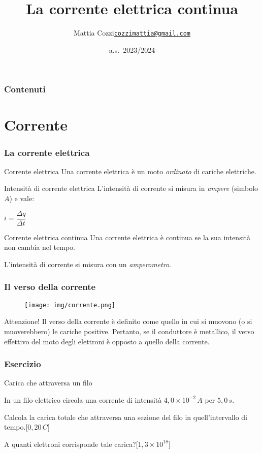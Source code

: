 \documentclass[]{beamer}
\title{La corrente elettrica continua}
\author{\texorpdfstring{Mattia Cozzi\newline\href{mailto:cozzimattia@gmail.com}{\texttt{cozzimattia@gmail.com}}}{Mattia Cozzi}}
\date{a.s.~2023/2024}
\theoremstyle{plain}
\begin{document}
\begin{frame}
  \titlepage
\end{frame}





\begin{frame}
\frametitle{Contenuti}
\tableofcontents
\end{frame}


\section{Corrente}





\begin{frame}
\frametitle{La corrente elettrica}
\begin{block}{Corrente elettrica}
Una corrente elettrica è un moto \emph{ordinato} di cariche elettriche.
\end{block}\pause
\begin{block}{Intensità di corrente elettrica}
L'intensità di corrente si misura in \emph{ampere} (simbolo $A$) e vale:
\begin{center}
\colorbox{blue!30}{$ i = \dfrac{\Delta q}{\Delta t} $}
\end{center}
\end{block}\pause
\begin{block}{Corrente elettrica continua}
Una corrente elettrica è continua se la sua intensità non cambia nel tempo.
\end{block}\pause
L'intensità di corrente si misura con un \emph{amperometro}.
\end{frame}


\begin{frame}
\frametitle{Il verso della corrente}
\begin{figure}
  \texttt{[image: img/corrente.png]}
\end{figure}
\begin{alertblock}{Attenzione!}
Il verso della corrente è definito come quello in cui si muovono (o si muoverebbero) le cariche positive.{\pause} Pertanto, se il conduttore è metallico, il verso effettivo del moto degli elettroni è \alert{opposto} a quello della corrente.
\end{alertblock}
\end{frame}



\begin{frame}
\frametitle{Esercizio}
\begin{exampleblock}{Carica che attraversa un filo}
  \small{
  In un filo elettrico circola una corrente di intensità $ 4,0 \times 10^{-2} \, A $ per $ 5,0 \, s $.

  Calcola la carica totale che attraversa una sezione del filo in quell'intervallo di tempo.\hspace*{\fill}[$ 0,20 \, C $]
  
  A quanti elettroni corrisponde tale carica?\hspace*{\fill}[$ 1,3 \times 10^{18} $]}
\end{exampleblock}
\end{frame}
\end{document}
